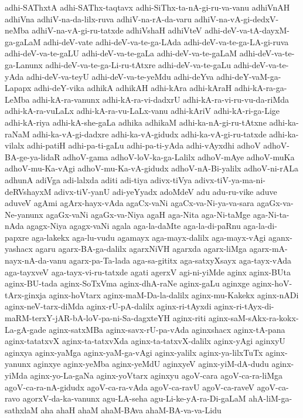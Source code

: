 {adhi-SAThxtA
adhi-SAThx-taqtavx
adhi-SiThx-ta-nA-gi-ru-va-vanu
adhiVnAH
adhiVna
adhiV-na-da-lilx-ruva
adhiV-na-rA-da-varu
adhiV-na-vA-gi-dedxV-neMba
adhiV-na-vA-gi-ru-tatxde
adhiVshaH
adhiVteV
adhi-deV-va-tA-dayxM-ga-gaLaM
adhi-deV-vate
adhi-deV-va-te-ga-LAda
adhi-deV-va-te-ga-LA-gi-ruva
adhi-deV-va-te-gaLU
adhi-deV-va-te-gaLa
adhi-deV-va-te-gaLaM
adhi-deV-va-te-ga-Lanunx
adhi-deV-va-te-ga-Li-ru-tAtxre
adhi-deV-va-te-gaLu
adhi-deV-va-te-yAda
adhi-deV-va-teyU
adhi-deV-va-te-yeMdu
adhi-deYva
adhi-deY-vaM-ga-Lapapx
adhi-deY-vika
adhikA
adhikAH
adhi-kAra
adhi-kAraH
adhi-kA-ra-ga-LeMba
adhi-kA-ra-vanunx
adhi-kA-ra-vi-dadxrU
adhi-kA-ra-vi-ru-vu-da-riMda
adhi-kA-ra-vuLaLx
adhi-kA-ra-vu-LaLx-vanu
adhi-kAriV
adhi-kA-ri-ga-Lige
adhi-kA-riya
adhi-kA-she-gaLa
adhika
adhikaM
adhi-ka-nA-gi-ru-tAtxne
adhi-ka-raNaM
adhi-ka-vA-gi-dadxre
adhi-ka-vA-gidudx
adhi-ka-vA-gi-ru-tatxde
adhi-ka-vilalx
adhi-patiH
adhi-pa-ti-gaLu
adhi-pa-ti-yAda
adhi-vAyxdhi
adhoV
adhoV-BA-ge-ya-lidaR
adhoV-gama
adhoV-loV-ka-ga-Lalilx
adhoV-mAye
adhoV-muKa
adhoV-mu-Ka-vAgi
adhoV-mu-Ka-vA-gidudx
adhoV-nA-Bi-yalilx
adhoV-ni-rALa
adhunA
adiVga
adi-lalxda
aditi
adi-tiya
adivx-tiVya
adivx-tiV-ya-ma-ni-deRVshayxM
adivx-tiV-yanU
adi-yeYyadx
adoMdeV
adu
adu-ru-vike
aduve
aduveV
agAmi
agArx-hayx-vAda
agaCx-vaNi
agaCx-va-Ni-ya-va-sara
agaGx-va-Ne-yanunx
agaGx-vaNi
agaGx-va-Niya
agaH
aga-Nita
aga-Ni-taMge
aga-Ni-ta-nAda
agagx-Niya
agagx-vaNi
agala
aga-la-daMte
aga-la-di-paRnu
aga-la-di-papxre
aga-lakekx
aga-lu-vudu
agamayx
aga-mayx-dalilx
aga-mayx-vAgi
aganx-yashacx
agaru
agarx-BA-ga-dalilx
agarxNiVH
agarxda
agarx-liMga
agarx-mA-nayx-nA-da-vanu
agarx-pa-Ta-lada
aga-sa-gititx
aga-satxyXsayx
aga-tayx-vAda
aga-tayxveV
aga-tayx-vi-ru-tatxde
agati
agerxV
agi-ni-yiMde
aginx
aginx-BUta
aginx-BU-tada
aginx-SoTxVma
aginx-dhA-raNe
aginx-gaLu
aginxge
aginx-hoV-tArx-ginxja
aginx-hoVtarx
aginx-maM-Da-la-dalilx
aginx-mu-Kakekx
aginx-nADi
aginx-neV-tarx-diMda
aginx-rU-pA-dalilx
aginx-ri-tAyxdi
aginx-ri-tAyx-di-maRM-terxY-jAR-bA-loV-pa-ni-Sa-dagxteYH
aginx-riti
aginx-saM-sAkx-ra-kokx-La-gA-gade
aginx-satxMBa
aginx-savx-rU-pa-vAda
aginxshacx
aginx-tA-pana
aginx-tatatxvX
aginx-ta-tatxvXda
aginx-ta-tatxvX-dalilx
aginx-yAgi
aginxyU
aginxya
aginx-yaMga
aginx-yaM-ga-vAgi
aginx-yalilx
aginx-ya-lilxTuTx
aginx-yanunx
aginxye
aginx-yeMba
aginx-yeMdU
aginxyeV
aginx-yiM-dA-dudu
aginx-yiMda
aginx-yo-La-gaNa
aginx-yoVtarx
aginxyu
agoV-cara
agoV-ca-ra-liMga
agoV-ca-ra-nA-gidudx
agoV-ca-ra-vAda
agoV-ca-ravU
agoV-ca-raveV
agoV-ca-ravo
agorxV-da-ka-vanunx
agu-LA-seha
agu-Li-ke-yA-ra-Di-gaLaM
ahA-liM-ga-sathxlaM
aha
ahaH
ahaM
ahaM-BAva
ahaM-BA-va-va-Lidu
}
